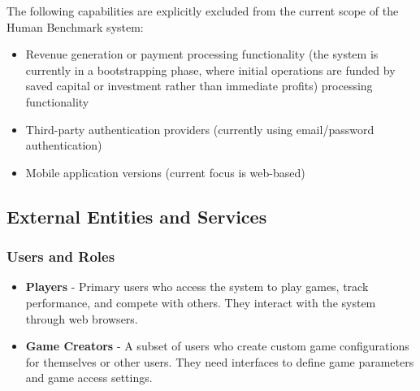 The following capabilities are explicitly excluded from the current scope of the Human Benchmark system:


\begin{itemize}
    \item Revenue generation or payment processing functionality (the system is
          currently in a bootstrapping phase, where initial operations are funded by
          saved capital or investment rather than immediate profits) %
          processing functionality
    \item Third-party authentication providers (currently using email/password
          authentication)
    \item Mobile application versions (current focus is web-based)
\end{itemize}

\subsection{External Entities and Services}

\subsubsection{Users and Roles}

\begin{itemize}
    \item \textbf{Players} - Primary users who access the system to play games,
          track performance, and compete with others. They interact with the system
          through web browsers.


    \item \textbf{Game Creators} - A subset of users who create custom game
          configurations for themselves or other users. They need interfaces to define
          game parameters and game access settings.
\end{itemize}

